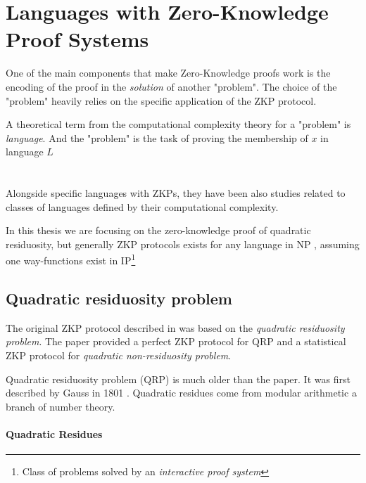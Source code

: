\section{Languages with Zero-Knowledge Proof Systems}

One of the main components that make Zero-Knowledge proofs work is the encoding of the proof in the \textit{solution} of another "problem". The choice of the "problem" heavily relies on the specific application of the ZKP protocol. %

A theoretical term from the computational complexity theory for a "problem" is \textit{language}. And the "problem" is the task of proving the membership of $x$ in language $L$ %
\\
\\
\\
Alongside specific languages with ZKPs, they have been also studies related to classes of languages defined by their computational complexity. %

In this thesis we are focusing on the zero-knowledge proof of quadratic residuosity, but generally ZKP protocols exists for any language in NP \cite{GMW}, assuming one way-functions exist in IP\footnote{Class of problems solved by an \textit{interactive proof system}}


\subsection{Quadratic residuosity problem}

The original ZKP protocol described in \cite{GMR} was based on the \textit{quadratic residuosity problem}.
The paper provided a perfect ZKP protocol for QRP and a statistical ZKP protocol for \textit{quadratic non-residuosity problem}.

\bigskip

Quadratic residuosity problem (QRP) is much older than the \cite{GMR} paper.
It was first described by Gauss in 1801 \cite{gauss1801disquisitiones}.
Quadratic residues come from modular arithmetic a branch of number theory.


\paragraph{Quadratic Residues}%

